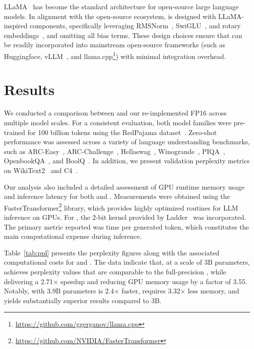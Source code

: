 LLaMA~\cite{llama, llama2} has become the standard architecture for open-source large language models. In alignment with the open-source ecosystem,  is designed with LLaMA-inspired components, specifically leveraging RMSNorm~\cite{rmsnorm}, SwiGLU~\cite{swiglu}, and rotary embeddings~\cite{rope}, and omitting all bias terms. These design choices ensure that  can be readily incorporated into mainstream open-source frameworks (such as Huggingface, vLLM~\cite{vllm}, and llama.cpp\footnote{\url{https://github.com/ggerganov/llama.cpp}}) with minimal integration overhead.

\section{Results}

We conducted a comparison between  and our re-implemented FP16  across multiple model scales. For a consistent evaluation, both model families were pre-trained for 100 billion tokens using the RedPajama dataset~\cite{redpajama}. Zero-shot performance was assessed across a variety of language understanding benchmarks, such as ARC-Easy~\cite{arc}, ARC-Challenge~\cite{arc}, Hellaswag~\cite{hellaswag}, Winogrande~\cite{winoGrande}, PIQA~\cite{piqa}, OpenbookQA~\cite{openbookqa}, and BoolQ~\cite{boolq}. In addition, we present validation perplexity metrics on WikiText2~\cite{wikitext2} and C4~\cite{c4}.

Our analysis also included a detailed assessment of GPU runtime memory usage and inference latency for both  and . Measurements were obtained using the FasterTransformer\footnote{\url{https://github.com/NVIDIA/FasterTransformer}} library, which provides highly optimized routines for LLM inference on GPUs. For , the 2-bit kernel provided by Ladder~\cite{ladder} was incorporated. The primary metric reported was time per generated token, which constitutes the main computational expense during inference.

Table~\ref{tab:ppl} presents the perplexity figures along with the associated computational costs for  and . The data indicate that, at a scale of 3B parameters,  achieves perplexity values that are comparable to the full-precision , while delivering a 2.71$\times$ speedup and reducing GPU memory usage by a factor of 3.55. Notably,  with 3.9B parameters is 2.4$\times$ faster, requires 3.32$\times$ less memory, and yields substantially superior results compared to  3B.

